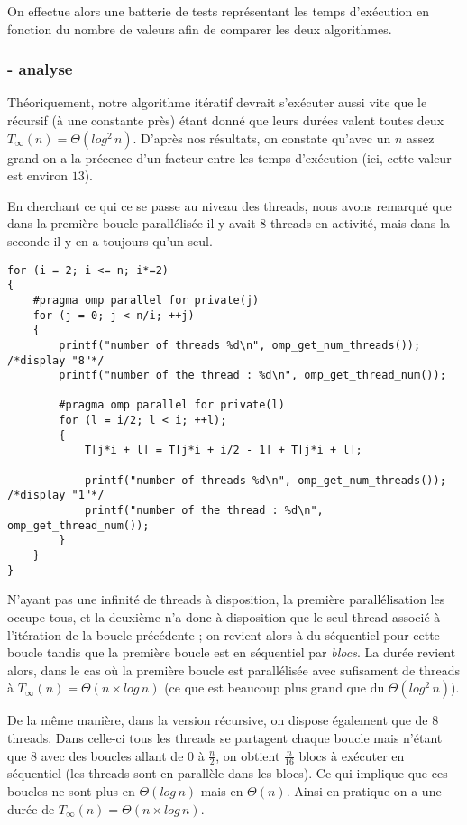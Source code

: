 On effectue alors une batterie de tests représentant les temps d'exécution en fonction du nombre de valeurs afin de comparer les deux algorithmes.



\subsubsection*{- analyse}
Théoriquement, notre algorithme itératif devrait s'exécuter aussi vite que le récursif (à une constante près) étant donné que leurs durées valent toutes deux $T_\infty(n) = \Theta (log^2 \, n)$. D'après nos résultats, on constate qu'avec un $n$ assez grand on a la précence d'un facteur entre les temps d'exécution (ici, cette valeur est environ $13$). 

En cherchant ce qui ce se passe au niveau des threads, nous avons remarqué que dans la première boucle parallélisée il y avait $8$ threads en activité, mais dans la seconde il y en a toujours qu'un seul.

\begin{lstlisting}[style=cilk, title=Parallélisation des boucles itératives avec les commandes OpenMP]
for (i = 2; i <= n; i*=2)
{
	#pragma omp parallel for private(j)
	for (j = 0; j < n/i; ++j)
	{
		printf("number of threads %d\n", omp_get_num_threads()); /*display "8"*/
		printf("number of the thread : %d\n", omp_get_thread_num());
        
		#pragma omp parallel for private(l)
		for (l = i/2; l < i; ++l);
        {
			T[j*i + l] = T[j*i + i/2 - 1] + T[j*i + l];
            
            printf("number of threads %d\n", omp_get_num_threads()); /*display "1"*/
            printf("number of the thread : %d\n", omp_get_thread_num());
		}
	}
}
\end{lstlisting}


N'ayant pas une infinité de threads à disposition, la première parallélisation les occupe tous, et la deuxième n'a donc à disposition que le seul thread associé à l'itération de la boucle précédente ; on revient alors à du séquentiel pour cette boucle tandis que la première boucle est en séquentiel par \emph{blocs}. La durée revient alors, dans le cas où la première boucle est parallélisée avec sufisament de threads à $T_\infty(n) = \Theta (n \times log \, n)$ (ce que est beaucoup plus grand que du $\Theta(log^2 \, n)$).

De la même manière, dans la version récursive, on dispose également que de $8$ threads. Dans celle-ci tous les threads se partagent chaque boucle mais n'étant que $8$ avec des boucles allant de $0$ à $\frac{n}{2}$, on obtient $\frac{n}{16}$ blocs à exécuter en séquentiel (les threads sont en parallèle dans les blocs). Ce qui implique que ces boucles ne sont plus en $\Theta (log \, n)$ mais en $\Theta (n)$. Ainsi en pratique on a une durée de $T_\infty(n) = \Theta (n \times log \, n)$.